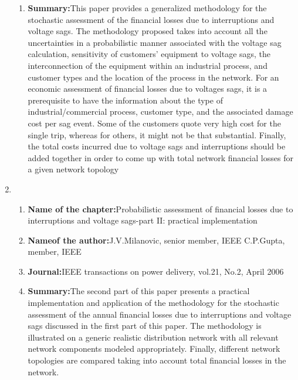 \documentclass[12pt, a4paper]{extreport}
\begin{document}
\begin{enumerate}
\begin{enumerate}
    \item{\textbf{Summary:}}This paper provides a
generalized methodology
for the stochastic
assessment of the financial
losses due to interruptions
and voltage sags. The
methodology proposed
takes into account all the
uncertainties in a
probabilistic manner
associated with the
voltage sag calculation,
sensitivity of customers’
equipment to voltage
sags, the interconnection
of the equipment within
an industrial process, and
customer types and the
location of the process in
the network. For an
economic assessment of
financial losses due to
voltages sags, it is a
prerequisite to have the
information about the
type of
industrial/commercial
process, customer type,
and the associated
damage cost per sag event. Some of the
customers quote very high
cost for the single trip,
whereas for others, it
might not be that
substantial. Finally, the
total costs incurred due to
voltage sags and
interruptions
should be added together
in order to come up with
total network financial
losses for a given network topology
    \end{enumerate}
    \item
    \begin{enumerate}
    \item{\textbf{Name of the chapter:}}Probabilistic
assessment of
financial losses
due to
interruptions
and voltage
sags-part II:
practical
implementation
\item{\textbf{Nameof the author:}}J.V.Milanovic,
senior member,
IEEE
C.P.Gupta,
member, IEEE
\item{\textbf{Journal:}}IEEE
transactions
on power
delivery,
vol.21, No.2,
April 2006
\item{\textbf{Summary:}}The second part of this
paper presents a practical
implementation and
application of the
methodology for the
stochastic assessment of
the annual financial losses
due to interruptions and
voltage sags discussed in
the first part of this
paper. The methodology
is illustrated on a generic
realistic distribution
network with all relevant
network components
modeled appropriately.
Finally, different network
topologies are compared
taking into account total
financial losses in the network.
\end{enumerate}


\end{enumerate}
\end{document}
